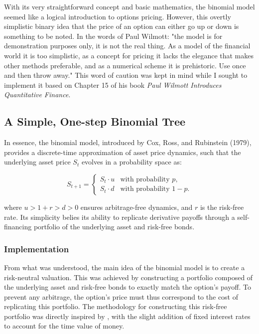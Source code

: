\documentclass{article}
\begin{document}
    With its very straightforward concept and basic mathematics, the binomial model seemed like a logical introduction to options pricing. However, this overtly simplistic binary idea that the price of an option can either go up or down is something to be noted. In the words of Paul Wilmott: "the model is for demonstration purposes only, it is not the real thing. As a model of the financial world it is too simplistic, as a concept for pricing it lacks the elegance that makes other methods preferable, and as a numerical scheme it is prehistoric. Use once and then throw away." This word of caution was kept in mind while I sought to implement it based on Chapter 15 of his book \textit{Paul Wilmott Introduces Quantitative Finance}.

    \subsection{A Simple, One-step Binomial Tree}

    In essence, the binomial model, introduced by Cox, Ross, and Rubinstein (1979), provides a discrete-time approximation of asset price dynamics, such that the underlying asset price \( S_t \) evolves in a probability space as:

    \[
        S_{t+1} =
        \begin{cases}
            S_t \cdot u & \text{with probability } p, \\
            S_t \cdot d & \text{with probability } 1 - p.
        \end{cases}
    \]

    where \( u > 1 + r > d > 0 \) ensures arbitrage-free dynamics, and \( r \) is the risk-free rate. Its simplicity belies its ability to replicate derivative payoffs through a self-financing portfolio of the underlying asset and risk-free bonds.

    \subsubsection{Implementation}

    From what was understood, the main idea of the binomial model is to create a risk-neutral valuation. This was achieved by constructing a portfolio composed of the underlying asset and risk-free bonds to exactly match the option's payoff. To prevent any arbitrage, the option's price must thus correspond to the cost of replicating this portfolio. The methodology for constructing this risk-free portfolio was directly inspired by \cite{binomial_options_pricing_yt}, with the slight addition of fixed interest rates to account for the time value of money.
\end{document}
